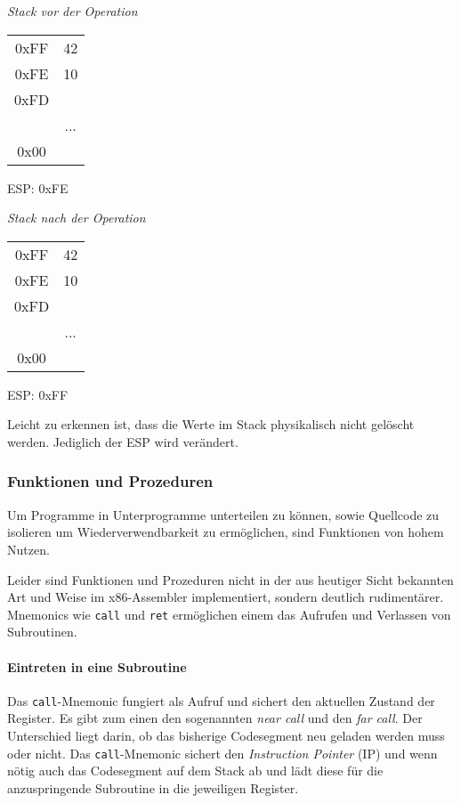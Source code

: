 \begin{multicols}{2}

\begin{minipage}{5cm}
\emph{Stack vor der Operation}
\begin{tabular}{c|c|}
	\cline{2-2}
   0xFF & 42\\ \cline{2-2}
   0xFE & 10\\ \cline{2-2}
   0xFD & \\ \cline{2-2}
	      & ... \\ \cline{2-2}
	 0x00 & \\ \cline{2-2}
\end{tabular}
ESP: 0xFE
\end{minipage}

\begin{minipage}{5cm}
\emph{Stack nach der Operation}
\begin{tabular}{c|c|}
	\cline{2-2}
   0xFF & 42\\ \cline{2-2}
   0xFE & 10\\ \cline{2-2}
   0xFD & \\ \cline{2-2}
	      & ... \\ \cline{2-2}
	 0x00 & \\ \cline{2-2}
\end{tabular}
ESP: 0xFF
\end{minipage}
\end{multicols}

Leicht zu erkennen ist, dass die Werte im Stack physikalisch nicht gelöscht werden. Jediglich der ESP  wird verändert.

\subsubsection{Funktionen und Prozeduren}

Um Programme in Unterprogramme unterteilen zu können, sowie Quellcode zu isolieren um Wiederverwendbarkeit zu ermöglichen, sind Funktionen von hohem Nutzen.\cite[S. 179]{intelmanual}

Leider sind Funktionen und Prozeduren nicht in der aus heutiger Sicht bekannten Art und Weise im x86-Assembler implementiert, sondern deutlich rudimentärer.
Mnemonics wie \texttt{call} und \texttt{ret} ermöglichen einem das Aufrufen und Verlassen von Subroutinen.

\paragraph{Eintreten in eine Subroutine}
Das \texttt{call}-Mnemonic fungiert als Aufruf und sichert den aktuellen Zustand der Register.
Es gibt zum einen den sogenannten \textit{near call} und den \textit{far call}.
Der Unterschied liegt darin, ob das bisherige Codesegment neu geladen werden muss oder nicht.
Das \texttt{call}-Mnemonic sichert den \textit{Instruction Pointer} (IP) und wenn nötig auch das Codesegment auf dem Stack ab und lädt diese für die anzuspringende Subroutine in die jeweiligen Register.

